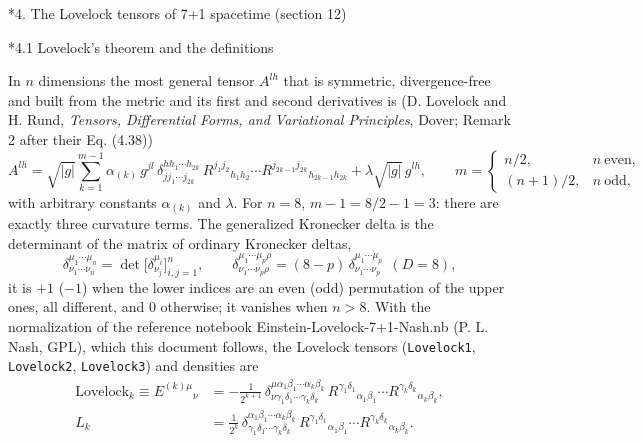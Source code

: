 \documentclass[10pt,a4paper]{article}
\makeatletter
\renewcommand\section{\@startsection{section}{1}{\z@}{-3.5ex \@plus -1ex \@minus -.2ex}{2.3ex \@plus.2ex}{\normalfont\Large\bfseries\raggedright}}
\renewcommand\subsection{\@startsection{subsection}{2}{\z@}{-3.25ex\@plus -1ex \@minus -.2ex}{1.5ex \@plus .2ex}{\normalfont\large\bfseries\raggedright}}
\makeatother
\begin{document}
\section*{4. The Lovelock tensors of 7+1 spacetime (section 12)}
\subsection*{4.1 Lovelock’s theorem and the definitions}
In $n$ dimensions the most general tensor $A^{lh}$ that is symmetric, divergence-free and built from the metric and its first and second derivatives is (D. Lovelock and H. Rund, \emph{Tensors, Differential Forms, and Variational Principles}, Dover; Remark 2 after their Eq. (4.38))
\begin{equation*}
A^{lh}=\sqrt{|g|}\sum_{k=1}^{m-1}\alpha_{(k)}\,g^{jl}\,\delta^{h h_1\cdots h_{2k}}_{j j_1\cdots j_{2k}}\,R^{j_1j_2}{}_{h_1h_2}\cdots R^{j_{2k-1}j_{2k}}{}_{h_{2k-1}h_{2k}}+\lambda\sqrt{|g|}\,g^{lh},\qquad m=\begin{cases}n/2,&n\ \text{even},\\(n+1)/2,&n\ \text{odd},\end{cases}
\end{equation*}
with arbitrary constants $\alpha_{(k)}$ and $\lambda$. For $n=8$, $m-1=8/2-1=3$: there are exactly three curvature terms. The generalized Kronecker delta is the determinant of the matrix of ordinary Kronecker deltas,
\begin{equation*}
\delta^{\mu_1\cdots\mu_n}_{\nu_1\cdots\nu_n}=\det\big[\delta^{\mu_i}_{\nu_j}\big]_{i,j=1}^{n},\qquad \delta^{\mu_1\cdots\mu_p\rho}_{\nu_1\cdots\nu_p\rho}=(8-p)\,\delta^{\mu_1\cdots\mu_p}_{\nu_1\cdots\nu_p}\ \ (D=8),
\end{equation*}
it is $+1$ ($-1$) when the lower indices are an even (odd) permutation of the upper ones, all different, and $0$ otherwise; it vanishes when $n>8$. With the normalization of the reference notebook Einstein-Lovelock-7+1-Nash.nb (P. L. Nash, GPL), which this document follows, the Lovelock tensors (\texttt{Lovelock1}, \texttt{Lovelock2}, \texttt{Lovelock3}) and densities are
\begin{align*}
\mathrm{Lovelock}_k\equiv E^{(k)\mu}{}_{\nu}&=-\frac{1}{2^{k+1}}\,\delta^{\mu\alpha_1\beta_1\cdots\alpha_k\beta_k}_{\nu\gamma_1\delta_1\cdots\gamma_k\delta_k}\,R^{\gamma_1\delta_1}{}_{\alpha_1\beta_1}\cdots R^{\gamma_k\delta_k}{}_{\alpha_k\beta_k}, \\
L_k&=\frac{1}{2^k}\,\delta^{\alpha_1\beta_1\cdots\alpha_k\beta_k}_{\gamma_1\delta_1\cdots\gamma_k\delta_k}\,R^{\gamma_1\delta_1}{}_{\alpha_1\beta_1}\cdots R^{\gamma_k\delta_k}{}_{\alpha_k\beta_k}.
\end{align*}
\end{document}
